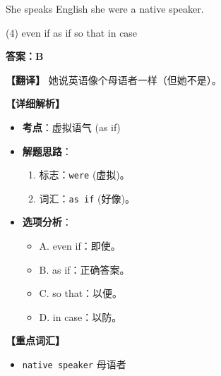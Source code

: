 \documentclass[11pt, a4paper]{article}
\newcommand{\analysis}[4]{
    \begin{solutionbox}
        \textbf{答案：#1}
        
        \textbf{【翻译】} #2
        
        \textbf{【详细解析】}
        #3
        
        \textbf{【重点词汇】}
        #4
    \end{solutionbox}
}
\newcommand{\blank}{\underline{\hspace{1.5cm}}}
\begin{document}
\begin{questions}
    \item She speaks English \blank she were a native speaker.
    \begin{tasks}(4)
        \task even if \task as if \task so that \task in case
    \end{tasks}
    \analysis{B}{她说英语像个母语者一样（但她不是）。}{
        \begin{itemize}
            \item \textbf{考点}：虚拟语气 (as if)
            \item \textbf{解题思路}：
                \begin{enumerate}
                    \item 标志：\texttt{were} (虚拟)。
                    \item 词汇：\texttt{as if} (好像)。
                \end{enumerate}
            \item \textbf{选项分析}：
                \begin{itemize}
                    \item A. even if：即使。
                    \item B. as if：正确答案。
                    \item C. so that：以便。
                    \item D. in case：以防。
                \end{itemize}
        \end{itemize}
    }{
        \begin{itemize}
            \item \texttt{native speaker} 母语者
        \end{itemize}
    }


\end{questions}
\end{document}

